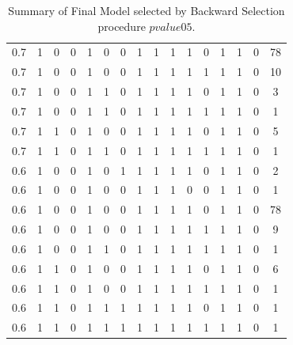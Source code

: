 \documentclass[12pt, letter]{article}\usepackage[]{graphicx}\usepackage[]{color}
\begin{document}
\begin{table}
{\begin{tabular}{|c|c|c|c|c|c|c|c|c|c|c|c|c|c|c|c|}
  0.7 & 1 & 0 & 0 & 1 & 0 & 0 & 1 & 1 & 1 & 1 & 0 & 1 & 1 & 0 & 78 \\ 
  0.7 & 1 & 0 & 0 & 1 & 0 & 0 & 1 & 1 & 1 & 1 & 1 & 1 & 1 & 0 & 10 \\ 
  0.7 & 1 & 0 & 0 & 1 & 1 & 0 & 1 & 1 & 1 & 1 & 0 & 1 & 1 & 0 & 3 \\ 
  0.7 & 1 & 0 & 0 & 1 & 1 & 0 & 1 & 1 & 1 & 1 & 1 & 1 & 1 & 0 & 1 \\ 
  0.7 & 1 & 1 & 0 & 1 & 0 & 0 & 1 & 1 & 1 & 1 & 0 & 1 & 1 & 0 & 5 \\ 
  0.7 & 1 & 1 & 0 & 1 & 1 & 0 & 1 & 1 & 1 & 1 & 1 & 1 & 1 & 0 & 1 \\ 
   \hline
0.6 & 1 & 0 & 0 & 1 & 0 & 1 & 1 & 1 & 1 & 1 & 0 & 1 & 1 & 0 & 2 \\ 
  0.6 & 1 & 0 & 0 & 1 & 0 & 0 & 1 & 1 & 1 & 0 & 0 & 1 & 1 & 0 & 1 \\ 
  0.6 & 1 & 0 & 0 & 1 & 0 & 0 & 1 & 1 & 1 & 1 & 0 & 1 & 1 & 0 & 78 \\ 
  0.6 & 1 & 0 & 0 & 1 & 0 & 0 & 1 & 1 & 1 & 1 & 1 & 1 & 1 & 0 & 9 \\ 
  0.6 & 1 & 0 & 0 & 1 & 1 & 0 & 1 & 1 & 1 & 1 & 1 & 1 & 1 & 0 & 1 \\ 
  0.6 & 1 & 1 & 0 & 1 & 0 & 0 & 1 & 1 & 1 & 1 & 0 & 1 & 1 & 0 & 6 \\ 
  0.6 & 1 & 1 & 0 & 1 & 0 & 0 & 1 & 1 & 1 & 1 & 1 & 1 & 1 & 0 & 1 \\ 
  0.6 & 1 & 1 & 0 & 1 & 1 & 1 & 1 & 1 & 1 & 1 & 0 & 1 & 1 & 0 & 1 \\ 
  0.6 & 1 & 1 & 0 & 1 & 1 & 1 & 1 & 1 & 1 & 1 & 1 & 1 & 1 & 0 & 1 \\ 
   \hline
\end{tabular}
}
\caption{Summary of Final Model selected by Backward Selection procedure $pvalue05$.} 
\label{simpvalue05}
\end{table}
\end{document}

